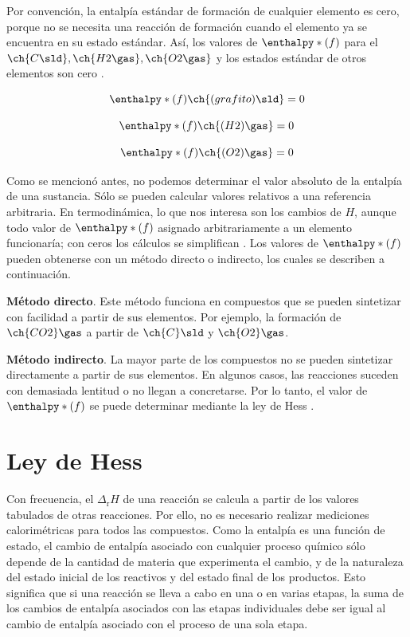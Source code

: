 Por convención, la entalpía estándar de formación de cualquier elemento es cero, porque no se necesita una reacción de formación cuando el elemento ya se encuentra en su estado estándar. Así, los valores de $\enthalpy*(f){}$ para el $\ch{C\sld}, \ch{H2\gas}, \ch{O2\gas}$ y los estados estándar de otros elementos son cero \cite{Chang2008}.

\begin{equation}
	\enthalpy*(f){} \ch{(grafito)\sld} = 0
\label{eq:3.6}
\end{equation}

\begin{equation}
	\enthalpy*(f){} \ch{(H2)\gas} = 0
\label{eq:3.7}
\end{equation}

\begin{equation}
	\enthalpy*(f){} \ch{(O2)\gas} = 0
\label{eq:3.8}
\end{equation}

Como se mencionó antes, no podemos determinar el valor absoluto de la entalpía de una sustancia. Sólo se pueden calcular valores relativos a una referencia arbitraria. En termodinámica, lo que nos interesa son los cambios de $H$, aunque todo valor de $\enthalpy*(f){}$ asignado arbitrariamente a un elemento funcionaría; con ceros los cálculos se simplifican \cite{Chang2008}. Los valores de $\enthalpy*(f){}$ pueden obtenerse con un método directo o indirecto, los cuales se describen a continuación.

\textbf{Método directo}. Este método funciona en compuestos que se pueden sintetizar con facilidad a partir de sus elementos. Por ejemplo, la formación de $\ch{CO2}\gas$ a partir de $\ch{C}\sld$ y $\ch{O2}\gas$.

\textbf{Método indirecto}. La mayor parte de los compuestos no se pueden sintetizar directamente a partir de sus elementos. En algunos casos, las reacciones suceden con demasiada lentitud o no llegan a concretarse. Por lo tanto, el valor de $\enthalpy*(f){}$ se puede determinar mediante la ley de Hess \cite{Chang2008}. 

\section{Ley de Hess} \label{sec:Hess}

Con frecuencia, el $\Delta_{\mathrm{r}}H$ de una reacción se calcula a partir de los valores tabulados de otras reacciones. Por ello, no es necesario realizar mediciones calorimétricas para todos las compuestos. Como la entalpía es una función de estado, el cambio de entalpía asociado con cualquier proceso químico sólo depende de la cantidad de materia que experimenta el cambio, y de la naturaleza del estado inicial de los reactivos y del estado final de los productos. Esto significa que si una reacción se lleva a cabo en una o en varias etapas, la suma de los cambios de entalpía asociados con las etapas individuales debe ser igual al cambio de entalpía asociado con el proceso de una sola etapa.\\

